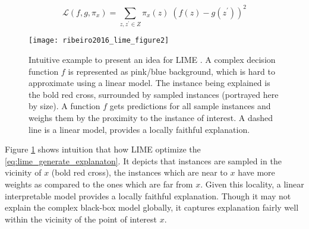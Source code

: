 \documentclass[english]{tktltiki2}
\theoremstyle{definition}
\theoremstyle{remark}
\newcommand{\onespace}{\;}
\begin{document}
\begin{equation}\label{eq:lime_measure_unfaithfulness}
\mathcal{L}(f, g, \pi_x) = \sum_{z, z^\prime \in Z} \pi_x(z)\onespace(f(z) - g(z^\prime))^2
\end{equation}


\begin{figure}[H]
	\centering
	\vspace*{-2mm}
	\texttt{[image: ribeiro2016\_lime\_figure2]}
	\vspace*{-10mm}
	\caption{Intuitive example to present an idea for LIME  \citep{ribeiro2016should}. A complex decision function $f$ is represented as pink/blue background, which is hard to approximate using a linear model. The instance being explained is the bold red cross, surrounded by sampled instances (portrayed here by size). A function $f$ gets predictions for all sample instances and weighs them by the proximity to the instance of interest. A dashed line is a linear model, provides a locally faithful explanation. }
	\label{fig:ribeiro2016_lime_figure2}
\end{figure}

Figure \ref{fig:ribeiro2016_lime_figure2} shows intuition that how LIME \citep{ribeiro2016should} optimize the \eqref{eq:lime_generate_explanaton}. It depicts that instances are sampled in the vicinity of $x$ (bold red cross), the instances which are near to $x$ have more weights as compared to the ones which are far from $x$. Given this locality, a linear interpretable model provides a locally faithful explanation. Though it may not explain the complex black-box model globally, it captures explanation fairly well within the vicinity of the point of interest $x$. 
\end{document}
